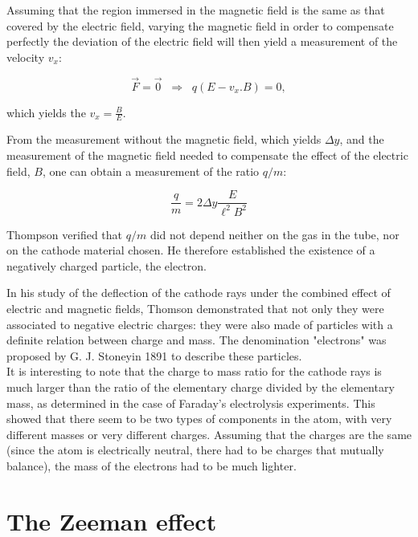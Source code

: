 \begin{framed}
\begin{experiment}
Assuming that the region immersed in the magnetic field is the same as that covered by the electric field, varying the magnetic field in order to compensate perfectly the deviation of the electric field will then yield a measurement of the velocity $v_x$:

\begin{equation*} \vec{F} = \vec{0} \; \; \Rightarrow \; \; q(E - v_x . B) = 0,\end{equation*}

which yields the $v_x=\frac{B}{E}$.

From the measurement without the magnetic field, which yields $\Delta y$, and the measurement of the magnetic field needed to compensate the effect of the electric field, $B$, one can obtain a measurement of the ratio $q/m$:

$$ \frac{q}{m} = 2 \Delta y \frac{E}{\ell^2 B^2} $$

Thompson verified that $q/m$ did not depend neither on the gas in the tube, nor on the cathode material chosen. He therefore established the existence of a negatively charged particle, the electron.
    \end{experiment}    
     \end{framed}       

In his study of the deflection of the cathode rays under the combined effect of electric and magnetic fields, Thomson demonstrated that not only they were associated to negative electric charges: they were also made of particles with a definite relation between charge and mass. The denomination "electrons" was proposed by G. J. Stoneyin 1891 to describe these particles.\\

It is interesting to note that the charge to mass ratio for the cathode rays is much larger than the ratio of the elementary charge divided by the elementary mass, as determined in the case of Faraday's electrolysis experiments. This showed that there seem to be two types of components in the atom, with very different masses or very different charges. Assuming that the charges are the same (since the atom is electrically neutral, there had to be charges that mutually balance), the mass of the electrons had to be much lighter.\\

\section{The Zeeman effect}

